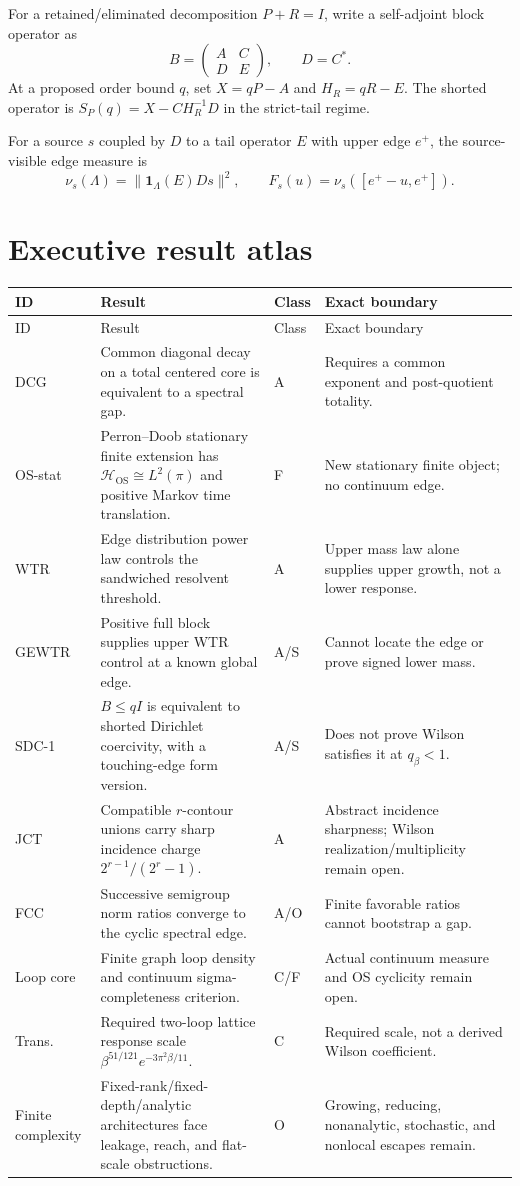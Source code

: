 \documentclass[11pt,oneside]{report}
\theoremstyle{definition}
\theoremstyle{remark}
\newcommand{\HOS}{\mathcal H_{\mathrm{OS}}}
\newcommand{\one}{\mathbf 1}
\begin{document}
For a retained/eliminated decomposition $P+R=I$, write a self-adjoint block
operator as
\[
B=\begin{pmatrix}A&C\\D&E\end{pmatrix},\qquad D=C^*.
\]
At a proposed order bound $q$, set $X=qP-A$ and $H_R=qR-E$. The shorted
operator is $S_P(q)=X-CH_R^{-1}D$ in the strict-tail regime.

For a source $s$ coupled by $D$ to a tail operator $E$ with upper edge $e^+$,
the source-visible edge measure is
\[
 \nu_s(\Lambda)=\|\one_\Lambda(E)Ds\|^2,\qquad
 F_s(u)=\nu_s([e^+-u,e^+]).
\]

\section{Executive result atlas}
\scriptsize
\begin{longtable}{p{}p{}p{}p{}}
\toprule ID & Result & Class & Exact boundary \\
\midrule\endfirsthead
\toprule ID & Result & Class & Exact boundary \\
\midrule\endhead
DCG & Common diagonal decay on a total centered core is equivalent to a spectral gap. & A & Requires a common exponent and post-quotient totality. \\
OS-stat & Perron--Doob stationary finite extension has $\HOS\cong L^2(\pi)$ and positive Markov time translation. & F & New stationary finite object; no continuum edge. \\
WTR & Edge distribution power law controls the sandwiched resolvent threshold. & A & Upper mass law alone supplies upper growth, not a lower response. \\
GEWTR & Positive full block supplies upper WTR control at a known global edge. & A/S & Cannot locate the edge or prove signed lower mass. \\
SDC-1 & $B\leq qI$ is equivalent to shorted Dirichlet coercivity, with a touching-edge form version. & A/S & Does not prove Wilson satisfies it at $q_\beta<1$. \\
JCT & Compatible $r$-contour unions carry sharp incidence charge $2^{r-1}/(2^r-1)$. & A & Abstract incidence sharpness; Wilson realization/multiplicity remain open. \\
FCC & Successive semigroup norm ratios converge to the cyclic spectral edge. & A/O & Finite favorable ratios cannot bootstrap a gap. \\
Loop core & Finite graph loop density and continuum sigma-completeness criterion. & C/F & Actual continuum measure and OS cyclicity remain open. \\
Trans. & Required two-loop lattice response scale $\beta^{51/121}e^{-3\pi^2\beta/11}$. & C & Required scale, not a derived Wilson coefficient. \\
Finite complexity & Fixed-rank/fixed-depth/analytic architectures face leakage, reach, and flat-scale obstructions. & O & Growing, reducing, nonanalytic, stochastic, and nonlocal escapes remain. \\
\bottomrule
\end{longtable}
\normalsize
\end{document}
